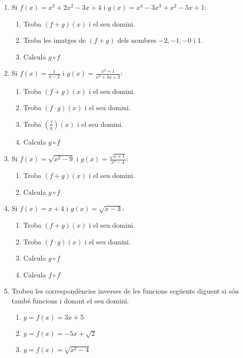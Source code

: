 \documentclass{article}
\begin{document}
	\author{Mireia Dosil}
	\date{text}



\begin{enumerate}
 

\item Si $f(x)=x^3+2x^2-3x+4$ i $g(x)=x^4-3x^3+x^2-5x+1$:

\begin{enumerate}
	\item Troba $(f+g)(x)$ i el seu domini.
	\item Troba les imatges de $(f+g)$ dels nombres $-2,-1,-0$ i $1$.
	\item Calcula $g \circ f$
\end{enumerate}

\item Si $f(x)=\frac{1}{x-2}$ i $g(x)=\frac{x^2+1}{x^2+4x+3}$:

\begin{enumerate}
	\item Troba $(f+g)(x)$ i el seu domini.
	\item Troba $(f\cdot g)(x)$ i el seu domini.
	\item Troba $(\frac{f}{g})(x)$ i el seu domini.
	\item Calcula $g \circ f$
\end{enumerate}


\item Si $f(x)=\sqrt{x^2-9}$ i $g(x)=\frac{\sqrt{x+1}}{x^2-4}$:

\begin{enumerate}
	\item Troba $(f+g)(x)$ i el seu domini.
	\item Calcula $g \circ f$
\end{enumerate}

\item Si $f(x)=x+4$ i $g(x)=\sqrt{x-3}$:

\begin{enumerate}
	\item Troba $(f+g)(x)$ i el seu domini.
	\item Troba $(f\cdot g)(x)$ i el seu domini.
	\item Calcula $g \circ f$
	\item Calcula $f \circ f$	
	
	
\end{enumerate}



\item Trobeu les correspondències inverses de les funcions següents diguent si són també funcions i donant el seu domini.


\begin{enumerate}
	\item $y=f(x)=3x+5$
	\item $y=f(x)=-5x+\sqrt{2}$
	\item $y=f(x)=\sqrt{x^2-4}$
	
	
\end{enumerate}


\end{enumerate}
 
\end{document}
